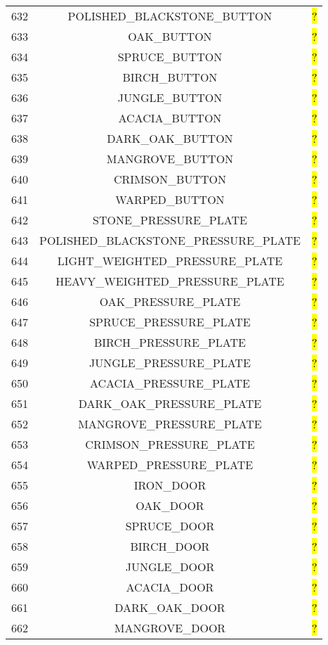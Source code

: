 \documentclass[11pt]{article}
\newcommand\myworries[1]{\sethlcolor{red}\hl{#1}}
\begin{document}
\begin{longtable}{ |c|c|c| }
	632 & POLISHED\_BLACKSTONE\_BUTTON & \myworries{?} \\
	633 & OAK\_BUTTON & \myworries{?} \\
	634 & SPRUCE\_BUTTON & \myworries{?} \\
	635 & BIRCH\_BUTTON & \myworries{?} \\
	636 & JUNGLE\_BUTTON & \myworries{?} \\
	637 & ACACIA\_BUTTON & \myworries{?} \\
	638 & DARK\_OAK\_BUTTON & \myworries{?} \\
	639 & MANGROVE\_BUTTON & \myworries{?} \\
	640 & CRIMSON\_BUTTON & \myworries{?} \\
	641 & WARPED\_BUTTON & \myworries{?} \\
	642 & STONE\_PRESSURE\_PLATE & \myworries{?} \\
	643 & POLISHED\_BLACKSTONE\_PRESSURE\_PLATE & \myworries{?} \\
	644 & LIGHT\_WEIGHTED\_PRESSURE\_PLATE & \myworries{?} \\
	645 & HEAVY\_WEIGHTED\_PRESSURE\_PLATE & \myworries{?} \\
	646 & OAK\_PRESSURE\_PLATE & \myworries{?} \\
	647 & SPRUCE\_PRESSURE\_PLATE & \myworries{?} \\
	648 & BIRCH\_PRESSURE\_PLATE & \myworries{?} \\
	649 & JUNGLE\_PRESSURE\_PLATE & \myworries{?} \\
	650 & ACACIA\_PRESSURE\_PLATE & \myworries{?} \\
	651 & DARK\_OAK\_PRESSURE\_PLATE & \myworries{?} \\
	652 & MANGROVE\_PRESSURE\_PLATE & \myworries{?} \\
	653 & CRIMSON\_PRESSURE\_PLATE & \myworries{?} \\
	654 & WARPED\_PRESSURE\_PLATE & \myworries{?} \\
	655 & IRON\_DOOR & \myworries{?} \\
	656 & OAK\_DOOR & \myworries{?} \\
	657 & SPRUCE\_DOOR & \myworries{?} \\
	658 & BIRCH\_DOOR & \myworries{?} \\
	659 & JUNGLE\_DOOR & \myworries{?} \\
	660 & ACACIA\_DOOR & \myworries{?} \\
	661 & DARK\_OAK\_DOOR & \myworries{?} \\
	662 & MANGROVE\_DOOR & \myworries{?} \\

\end{longtable}
\end{document}
